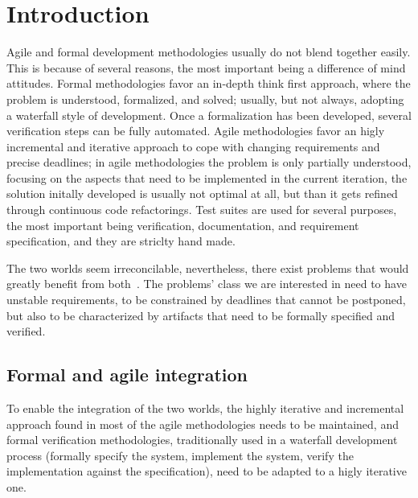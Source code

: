 \documentclass{article}
\begin{document}
\section{Introduction}
\label{sec:introduction}

Agile and formal development methodologies usually do not blend together easily.
This is because of several reasons, the most important being a difference of mind attitudes.
Formal methodologies favor an in-depth think first approach, where the problem is understood, formalized, and solved; usually, but not always, adopting a waterfall style of development.
Once a formalization has been developed, several verification steps can be fully automated.
Agile methodologies favor an higly incremental and iterative approach to cope with changing requirements and precise deadlines; in agile methodologies the problem is only partially understood, focusing on the aspects that need to be implemented in the current iteration, the solution initally developed is usually not optimal at all, but than it gets refined through continuous code refactorings.
Test suites are used for several purposes, the most important being verification, documentation, and requirement specification, and they are striclty hand made.

The two worlds seem irreconcilable, nevertheless, there exist problems that would greatly benefit from both~\cite{Black2009}.
The problems' class we are interested in need to have unstable requirements, to be constrained by deadlines that cannot be postponed, but also to be characterized by artifacts that need to be formally specified and verified.



\subsection{Formal and agile integration}
\label{subsec:formal_and_agile_integration}

To enable the integration of the two worlds, the highly iterative and incremental approach found in most of the agile methodologies needs to be maintained, and formal verification  methodologies, traditionally used in a waterfall development process (formally specify the system, implement the system, verify the implementation against the specification), need to be adapted to a higly iterative one.
\end{document}
